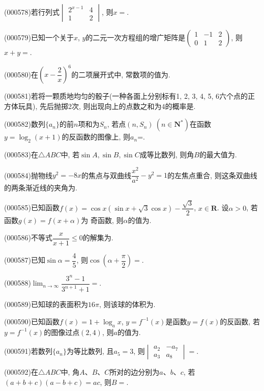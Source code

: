 \item (000578)若行列式$\begin{vmatrix} 2^{x-1} & 4  \\ 1 & 2 \end{vmatrix}$, 则$x=$.
\item (000579)已知一个关于$x$, $y$的二元一次方程组的增广矩阵是$\begin{pmatrix} 1 & -1 & 2 \\ 0 & 1 & 2 \end{pmatrix}$, 则$x+y=$.
\item (000580)在$(x-\dfrac2x)^6$的二项展开式中, 常数项的值为.
\item (000581)若将一颗质地均匀的骰子(一种各面上分别标有1, 2, 3, 4, 5, 6六个点的正方体玩具), 先后抛掷2次, 则出现向上的点数之和为$4$的概率是.
\item (000582)数列$\{a_n\}$的前$n$项和为$S_n$, 若点$(n,S_n) \ (n\in \mathbf{N}^*)$在函数$y=\log_2 (x+1)$的反函数的图像上, 则$a_n$=.
\item (000583)在$\triangle ABC$中, 若$\sin A,\sin B,\sin C$成等比数列, 则角$B$的最大值为.
\item (000584)抛物线$y^2=-8x$的焦点与双曲线$\dfrac{x^2}{a^2}-y^2=1$的左焦点重合, 则这条双曲线的两条渐近线的夹角为.
\item (000585)已知函数$f(x)=\cos x(\sin x+\sqrt3\cos x)-\dfrac{\sqrt3}2$, $x\in \mathbf{R}$. 设$\alpha>0$, 若函数$g(x)=f(x+\alpha)$为 奇函数, 则$\alpha$的值为.
\item (000586)不等式$\dfrac x{x+1}\le 0$的解集为.
\item (000587)已知$\sin\alpha=\dfrac45$, 则$\cos(\alpha+\dfrac{\pi}2)=$.
\item (000588)$\displaystyle\lim_{n\to\infty}\dfrac{3^n-1}{3^{n+1}+1}=$.
\item (000589)已知球的表面积为$16\pi$, 则该球的体积为.
\item (000590)已知函数$f(x)=1+\log_a x$, $y=f^{-1}(x)$是函数$y=f(x)$的反函数, 若$y=f^{-1}(x)$的图像过点$(2,4)$, 则$a$的值为.
\item (000591)若数列$\{a_n\}$为等比数列, 且$a_5=3$, 则$\begin{vmatrix} a_2 & -a_7 \\ a_3 & a_8 \end{vmatrix}=$.
\item (000592)在$\triangle ABC$中, 角$A$、$B$、$C$所对的边分别为$a$、$b$、$c$, 若$(a+b+c)(a-b+c)=ac$, 则$B=$.
